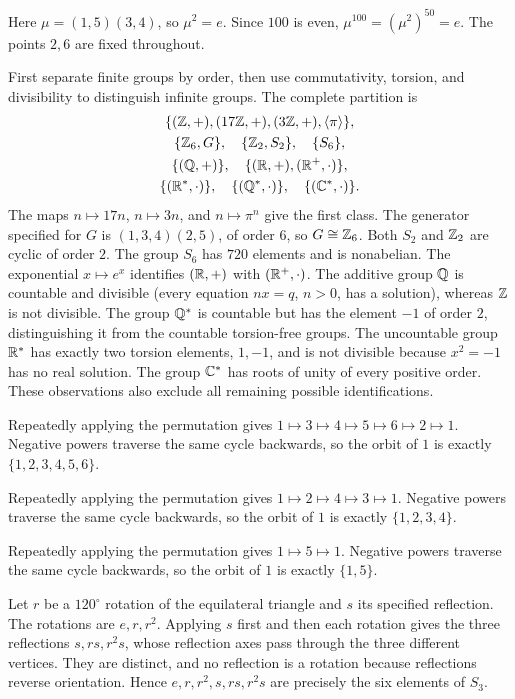 Here $\mu=(1,5)(3,4)$, so $\mu^2=e$. Since $100$ is even, $\mu^{100}=(\mu^2)^{50}=e$. The points $2,6$ are fixed throughout.

\idea First separate finite groups by order, then use commutativity, torsion, and divisibility to distinguish infinite groups.
The complete partition is
\[\begin{gathered}
\{(\mathbb{Z},+),(17\mathbb{Z},+),(3\mathbb{Z},+),\langle \pi\rangle\},\\
\{\mathbb{Z}_6,G\},\quad\{\mathbb{Z}_2,S_2\},\quad\{S_6\},\\
\{(\mathbb{Q},+)\},\quad\{(\mathbb{R},+),(\mathbb{R}^+,\cdot)\},\\
\{(\mathbb{R}^*,\cdot)\},\quad\{(\mathbb{Q}^*,\cdot)\},\quad\{(\mathbb{C}^*,\cdot)\}.
\end{gathered}\]
The maps $n\mapsto17n$, $n\mapsto3n$, and $n\mapsto\pi^n$ give the first class. The generator specified for $G$ is $(1,3,4)(2,5)$, of order $6$, so $G\cong\mathbb{Z}_6$. Both $S_2$ and $\mathbb{Z}_2$ are cyclic of order $2$. The group $S_6$ has $720$ elements and is nonabelian.
The exponential $x\mapsto e^x$ identifies $(\mathbb{R},+)$ with $(\mathbb{R}^+,\cdot)$. The additive group $\mathbb{Q}$ is countable and divisible (every equation $nx=q$, $n>0$, has a solution), whereas $\mathbb{Z}$ is not divisible. The group $\mathbb{Q}^*$ is countable but has the element $-1$ of order $2$, distinguishing it from the countable torsion-free groups. The uncountable group $\mathbb{R}^*$ has exactly two torsion elements, $1,-1$, and is not divisible because $x^2=-1$ has no real solution. The group $\mathbb{C}^*$ has roots of unity of every positive order. These observations also exclude all remaining possible identifications.

Repeatedly applying the permutation gives $1\mapsto3\mapsto4\mapsto5\mapsto6\mapsto2\mapsto1$. Negative powers traverse the same cycle backwards, so the orbit of $1$ is exactly $\{1,2,3,4,5,6\}$.

Repeatedly applying the permutation gives $1\mapsto2\mapsto4\mapsto3\mapsto1$. Negative powers traverse the same cycle backwards, so the orbit of $1$ is exactly $\{1,2,3,4\}$.

Repeatedly applying the permutation gives $1\mapsto5\mapsto1$. Negative powers traverse the same cycle backwards, so the orbit of $1$ is exactly $\{1,5\}$.

Let $r$ be a $120^\circ$ rotation of the equilateral triangle and $s$ its specified reflection. The rotations are $e,r,r^2$. Applying $s$ first and then each rotation gives the three reflections $s,rs,r^2s$, whose reflection axes pass through the three different vertices. They are distinct, and no reflection is a rotation because reflections reverse orientation. Hence $e,r,r^2,s,rs,r^2s$ are precisely the six elements of $S_3$.

